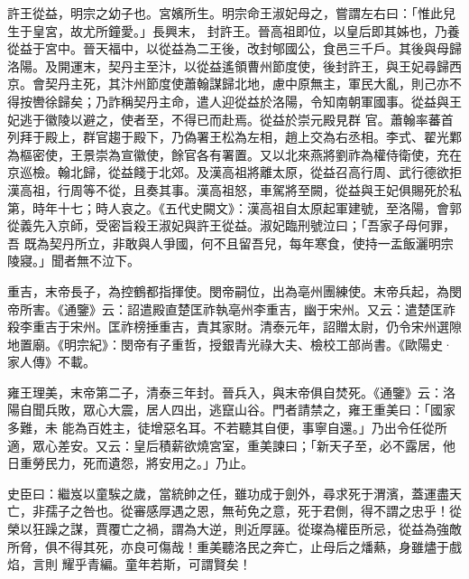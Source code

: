 \begin{pinyinscope}
 許王從益，明宗之幼子也。宮嬪所生。明宗命王淑妃母之，嘗謂左右曰：「惟此兒生于皇宮，故尤所鐘愛。」長興末，
 封許王。晉高祖即位，以皇后即其姊也，乃養從益于宮中。晉天福中，以從益為二王後，改封郇國公，食邑三千戶。其後與母歸洛陽。及開運末，契丹主至汴，以從益遙領曹州節度使，後封許王，與王妃尋歸西京。會契丹主死，其汴州節度使蕭翰謀歸北地，慮中原無主，軍民大亂，則己亦不得按轡徐歸矣；乃詐稱契丹主命，遣人迎從益於洛陽，令知南朝軍國事。從益與王妃逃于徽陵以避之，使者至，不得已而赴焉。從益於崇元殿見群
 官。蕭翰率蕃首列拜于殿上，群官趨于殿下，乃偽署王松為左相，趙上交為右丞相。李式、翟光鄴為樞密使，王景崇為宣徽使，餘官各有署置。又以北來燕將劉祚為權侍衛使，充在京巡檢。翰北歸，從益餞于北郊。及漢高祖將離太原，從益召高行周、武行德欲拒漢高祖，行周等不從，且奏其事。漢高祖怒，車駕將至闕，從益與王妃俱賜死於私第，時年十七；時人哀之。《五代史闕文》：漢高祖自太原起軍建號，至洛陽，會郭從義先入京師，受密旨殺王淑妃與許王從益。淑妃臨刑號泣曰；「吾家子母何罪，吾
 既為契丹所立，非敢與人爭國，何不且留吾兒，每年寒食，使持一盂飯灑明宗陵寢。」聞者無不泣下。



 重吉，末帝長子，為控鶴都指揮使。閔帝嗣位，出為亳州團練使。末帝兵起，為閔帝所害。《通鑒》云：詔遣殿直楚匡祚執亳州李重吉，幽于宋州。又云：遣楚匡祚殺李重吉于宋州。匡祚榜捶重吉，責其家財。清泰元年，詔贈太尉，仍令宋州選隙地置廟。《明宗紀》：閔帝有子重哲，授銀青光祿大夫、檢校工部尚書。《歐陽史·家人傳》不載。



 雍王理美，末帝第二子，清泰三年封。晉兵入，與末帝俱自焚死。《通鑒》云：洛陽自聞兵敗，眾心大震，居人四出，逃竄山谷。門者請禁之，雍王重美曰：「國家多難，未
 能為百姓主，徒增惡名耳。不若聽其自便，事寧自還。」乃出令任從所適，眾心差安。又云：皇后積薪欲燒宮室，重美諫曰；「新天子至，必不露居，他日重勞民力，死而遺怨，將安用之。」乃止。



 史臣曰：繼岌以童騃之歲，當統帥之任，雖功成于劍外，尋求死于渭濱，蓋運盡天亡，非孺子之咎也。從審感厚遇之恩，無茍免之意，死于君側，得不謂之忠乎！從榮以狂躁之謀，賈覆亡之禍，謂為大逆，則近厚誣。從璨為權臣所忌，從益為強敵所脅，俱不得其死，亦良可傷哉！重美聽洛民之奔亡，止母后之燔爇，身雖燼于戲焰，言則
 耀乎青編。童年若斯，可謂賢矣！



\end{pinyinscope}